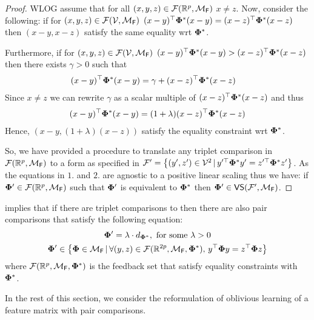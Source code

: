 \begin{proof}
    WLOG assume that for all $(x,y,z) \in {\mathcal{F}}(\mathbb{R}^{p}, {\mathcal{M}}_{\mathsf{F}})$ $x \neq z$. Now, consider the following: if for $(x,y,z) \in {\mathcal{F}}({\mathcal{V}}, {\mathcal{M}}_{\mathsf{F}})$ $(x-y)^\top{\boldsymbol{\Phi}^*}(x-y) = (x-z)^\top{\boldsymbol{\Phi}^*}(x-z)$ then $(x-y, x-z)$ satisfy the same equality wrt $\boldsymbol{\Phi}^*$.

    Furthermore, if for $(x,y,z) \in {\mathcal{F}}({\mathcal{V}}, {\mathcal{M}}_{\mathsf{F}})$ $(x-y)^\top{\boldsymbol{\Phi}^*}(x-y) > (x-z)^\top{\boldsymbol{\Phi}^*}(x-z)$ then there exists $\gamma > 0$ such that
       \begin{align*}
           &(x-y)^{\top}\boldsymbol{\Phi}^*(x-y) = \gamma + (x-z)^{\top}\boldsymbol{\Phi}^*(x-z)
       \end{align*}
       Since $x \neq z$ we can rewrite $\gamma$ as a scalar multiple of $(x-z)^{\top}\boldsymbol{\Phi}^*(x-z)$ and thus 
       \begin{align*}
           (x-y)^{\top}\boldsymbol{\Phi}^*(x-y) = (1 + \lambda) (x-z)^{\top}\boldsymbol{\Phi}^*(x-z)
       \end{align*}
       Hence, $(x - y, (1 + \lambda)(x-z))$ satisfy the equality constraint wrt $\boldsymbol{\Phi}^*$.
       
   So, we have provided a procedure to translate any triplet comparison in ${\mathcal{F}}(\mathbb{R}^{p}, {\mathcal{M}}_{\mathsf{F}})$ to a form as specified in ${\mathcal{F}}' = \left\{(y',z') \in{\mathcal{V}}^2\,|\, y'^\top{\boldsymbol{\Phi}^*}y' = z'^\top{\boldsymbol{\Phi}^*}z'\right\}$. As the equations in $1.$ and $2.$ are agnostic to a positive linear scaling thus we have: if $\boldsymbol{\Phi}' \in {\mathcal{F}}(\mathbb{R}^{p}, {\mathcal{M}}_{\mathsf{F}})$ such that $\boldsymbol{\Phi}'$ is equivalent to ${\boldsymbol{\Phi}^*}$ then $\boldsymbol{\Phi}' \in \textsf{VS}({\mathcal{F}}', {\mathcal{M}}_{\mathsf{F}})$.
\end{proof}

 implies that if there are triplet comparisons to  then there are also pair comparisons that satisfy the following equation:
\begin{subequations}
\begin{gather}
    \boldsymbol{\Phi}' = \lambda\cdot d_{\boldsymbol{\Phi}^*}, \text{ for some }\lambda > 0\\
    \boldsymbol{\Phi}'  \in \left\{\boldsymbol{\Phi} \in {\mathcal{M}}_{\mathsf{F}}\,|\, \forall (y,z) \in {\mathcal{F}}(\mathbb{R}^{2p},{\mathcal{M}}_{\mathsf{F}},\boldsymbol{\Phi}^*),\, y^{\top}\boldsymbol{\Phi} y = z^{\top}\boldsymbol{\Phi} z\right\} \label{eq: redsol}
\end{gather}
\end{subequations}
where ${\mathcal{F}}(\mathbb{R}^p,{\mathcal{M}}_{\mathsf{F}},\boldsymbol{\Phi}^*)$ is the feedback set that satisfy equality constraints with $\boldsymbol{\Phi}^*$.

In the rest of this section, we consider the reformulation of oblivious learning of a feature matrix with pair comparisons.

